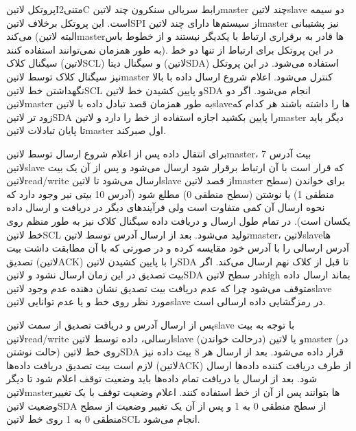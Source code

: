 پروتکل ‌لاتین{I‌متنی{2}C} رابط سریالی سنکرون چند ‌لاتین{master} چند ‌لاتین{slave} دو سیمه است. این پروتکل برخلاف ‌لاتین{SPI} از سیستم‌ها دارای چند ‌لاتین{master} نیز پشتیبانی می‌کند (البته ‌لاتین{master}ها قادر به برقراری ارتباط با یکدیگر نیستند و از خطوط باس به طور همزمان نمی‌توانند استفاده کنند). در این پروتکل برای ارتباط از تنها دو خط سیگنال کلاک (‌لاتین{SCL}) و سیگنال دیتا (‌لاتین{SDA}) استفاده می‌شود. در این پروتکل نیز سیگنال کلاک توسط ‌لاتین{master} کنترل می‌شود. اعلام شروع ارسال داده با بالا نگهداشتن خط ‌لاتین{SCL} و پایین کشیدن خط ‌لاتین{SDA} انجام می‌شود. اگر دو ‌لاتین{master} به طور همزمان قصد تبادل داده با ‌لاتین{slave}ها را داشته باشند هر کدام که زود تر ‌لاتین{SDA} را پایین بکشید اجازه استفاده از خط را دارد و ‌لاتین{master} دیگر باید تا پایان تبادلات ‌لاتین{master} اول صبرکند.

برای انتقال داده پس از اعلام شروع ارسال توسط ‌لاتین{master}، 7 بیت آدرس ‌لاتین{slave} که قرار است با آن ارتباط برقرار شود ارسال می‌شود و پس از آن یک بیت ‌لاتین{read/write} ارسال می‌شود تا ‌لاتین{slave} از قصد ‌لاتین{master} برای خواندن (سطح منطقی 1) یا نوشتن (سطح منطقی 0) مطلع شود (آدرس 10 بیتی نیر وجود دارد که نحوه ارسال آن کمی متفاوت است ولی فرآیند‌های دیگر در دریافت و ارسال داده یکسان است). در تمام طول ارسال و دریافت داده سیگنال کلاک نیز به طور منظم روی خط ‌لاتین{SCL} تولید می‌شود. بعد از ارسال آدرس توسط ‌لاتین{master}، ‌لاتین{slave}ها آدرس ارسالی را با آدرس خود مقایسه کرده و در صورتی که با آن مطابقت داشت بیت تصدیق (‌لاتین{ACK}) را با پایین کشیدن ‌لاتین{SDA} تا قبل از کلاک نهم ارسال می‌کند. اگر بیت تصدیق در این زمان ارسال نشود و ‌لاتین{SDA} در سطح ‌لاتین{high} بماند ارسال داده متوقف می‌شود چرا که عدم دریافت بیت تصدیق نشان دهنده عدم وجود ‌لاتین{slave} مورد نظر روی خط و یا عدم توانایی ‌لاتین{slave} در رمزگشایی داده ارسالی است. 

پس از ارسال آدرس و دریافت تصدیق از سمت ‌لاتین{slave} با توجه به بیت ‌لاتین{read/write} ارسالی، داده توسط ‌لاتین{slave} (درحالت خواندن) و یا ‌لاتین{master} (در حالت نوشتن) روی خط ‌لاتین{SDA} قرار داده می‌شود. بعد از ارسال هر 8 بیت داده نیز لازم است بیت تصدیق دریافت داده‌ها (‌لاتین{ACK}) از طرف دریافت کننده داده‌ها ارسال شود. بعد از ارسال یا دریافت تمام داده‌ها باید وضعیت توقف اعلام شود تا دیگر ‌لاتین{master}ها بتوانند پس از آن از خط استفاده کنند. اعلام وضعیت توقف با یک تغییر وضعیت ‌لاتین{SDA} از سطح منطقی 0 به 1 و پس از آن یک تغییر وضعیت از سطح منطقی 0 به 1  روی خط ‌لاتین{SCL} انجام می‌شود.

